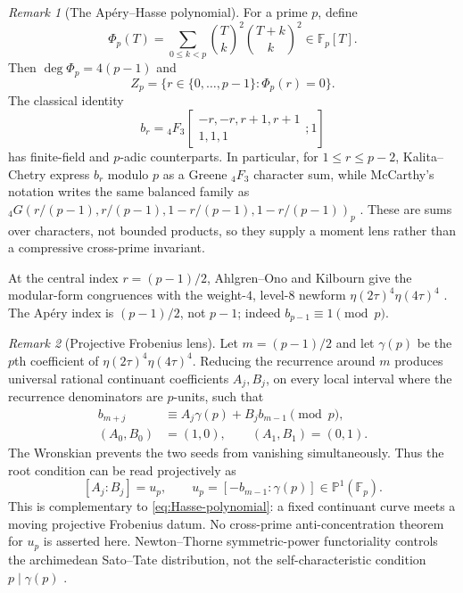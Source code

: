 \documentclass[11pt]{amsart}
\theoremstyle{plain}
\theoremstyle{remark}
\newtheorem{remark}{Remark}
\begin{document}
\begin{remark}[The Ap\'ery--Hasse polynomial]
For a prime $p$, define
\[
 \Phi_p(T)=\sum_{0\leq k<p}
   \binom Tk^2\binom{T+k}k^2\in\mathbb F_p[T].
 \tag{7.5}\label{eq:Hasse-polynomial}
\]
Then $\deg\Phi_p=4(p-1)$ and
\[
 Z_p=\{r\in\{0,\ldots,p-1\}:\Phi_p(r)=0\}.
\]
The classical identity
\[
 b_r={}_4F_3\!\left[
 \begin{matrix}-r,-r,r+1,r+1\\1,1,1\end{matrix};1\right]
\]
has finite-field and $p$-adic counterparts.  In particular, for
$1\leq r\leq p-2$, Kalita--Chetry express $b_r$ modulo $p$ as a
Greene ${}_4F_3$ character sum, while McCarthy's notation writes the
same balanced family as
${}_4G(r/(p-1),r/(p-1),1-r/(p-1),1-r/(p-1))_p$
\cite{KalitaChetry2017,Greene1987,McCarthy2012}.  These are sums over
characters, not bounded products, so they supply a moment lens rather
than a compressive cross-prime invariant.

At the central index $r=(p-1)/2$, Ahlgren--Ono and Kilbourn give the
modular-form congruences with the weight-$4$, level-$8$ newform
$\eta(2\tau)^4\eta(4\tau)^4$ \cite{AhlgrenOno2000,Kilbourn2006}.
The Ap\'ery index is $(p-1)/2$, not $p-1$; indeed
$b_{p-1}\equiv1\pmod p$.
\end{remark}

\begin{remark}[Projective Frobenius lens]
Let $m=(p-1)/2$ and let $\gamma(p)$ be the $p$th coefficient of
$\eta(2\tau)^4\eta(4\tau)^4$.  Reducing the recurrence around $m$
produces universal rational continuant coefficients $A_j,B_j$, on
every local interval where the recurrence denominators are $p$-units,
such that
\[
 \begin{aligned}
 b_{m+j}&\equiv A_j\gamma(p)+B_jb_{m-1}\pmod p,\\
 (A_0,B_0)&=(1,0),\qquad(A_1,B_1)=(0,1).
 \end{aligned}
 \tag{7.6}\label{eq:two-seed}
\]
The Wronskian prevents the two seeds from vanishing simultaneously.
Thus the root condition can be read projectively as
\[
 [A_j:B_j]=u_p,
 \qquad
 u_p=[-b_{m-1}:\gamma(p)]\in\mathbb P^1(\mathbb F_p).
 \tag{7.7}\label{eq:projective-frobenius}
\]
This is complementary to \eqref{eq:Hasse-polynomial}: a fixed
continuant curve meets a moving projective Frobenius datum.  No
cross-prime anti-concentration theorem for $u_p$ is asserted here.
Newton--Thorne symmetric-power functoriality controls the archimedean
Sato--Tate distribution, not the self-characteristic condition
$p\mid\gamma(p)$ \cite{NewtonThorne2021}.
\end{remark}
\end{document}
